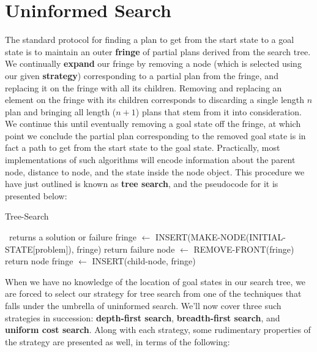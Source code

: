\documentclass{article}[letterpaper]
\begin{document}
\section*{Uninformed Search}
The standard protocol for finding a plan to get from the start state to a goal state is to maintain an outer
\textbf{fringe} of partial plans derived from the search tree. We continually \textbf{expand} our fringe by removing a node
(which is selected using our given \textbf{strategy}) corresponding to a partial plan from the fringe, and replacing
it on the fringe with all its children. Removing and replacing an element on the fringe with its children
corresponds to discarding a single length $n$ plan and bringing all length ($n+1$) plans that stem from it into
consideration. We continue this until eventually removing a goal state off the fringe, at which point we
conclude the partial plan corresponding to the removed goal state is in fact a path to get from the start state
to the goal state. Practically, most implementations of such algorithms will encode information about the
parent node, distance to node, and the state inside the node object. This procedure we have just outlined is
known as \textbf{tree search}, and the pseudocode for it is presented below:

\begin{algorithm}
	\caption{Tree-Search}
	\begin{algorithmic}[1]
   	        ~returns a solution or failure
	           \State fringe $\leftarrow$ INSERT(MAKE-NODE(INITIAL-STATE[problem]), fringe)
	           \Loop
	                   return failure
	               \EndIf
	            \State node $\leftarrow$ REMOVE-FRONT(fringe)
	                return node
	            \EndIf
	               \State fringe $\leftarrow$ INSERT(child-node, fringe)
	            \EndFor
	         \EndLoop
	         \EndFunction
	\end{algorithmic} 
\end{algorithm} 

When we have no knowledge of the location of goal states in our search tree, we are forced to select our
strategy for tree search from one of the techniques that falls under the umbrella of uninformed search.
We’ll now cover three such strategies in succession: \textbf{depth-first search}, \textbf{breadth-first search}, and \textbf{uniform
cost search}. Along with each strategy, some rudimentary properties of the strategy are presented as well, in
terms of the following:
\end{document}
